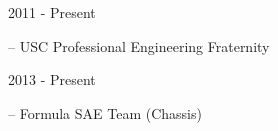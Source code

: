 


\flushleft \begin{minipage}[t]{\dateColWidth}
2011 - Present
\end{minipage}
\begin{minipage}[t]{0.8\textwidth}
 -- USC Professional Engineering Fraternity
\end{minipage}

\flushleft \begin{minipage}[t]{\dateColWidth}
2013 - Present
\end{minipage}
\begin{minipage}[t]{0.8\textwidth}
 -- Formula SAE Team (Chassis)
\end{minipage}

